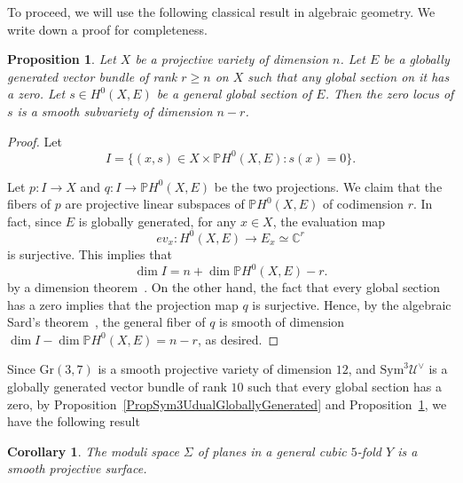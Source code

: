 \documentclass{article}
\newtheorem{proposition}[theorem]{Proposition}
\newtheorem{corollary}[theorem]{Corollary}
\theoremstyle{definition}
\begin{document}
To proceed, we will use the following classical result in algebraic geometry. We write down a proof for completeness.
\begin{proposition}\label{PropGloballyGeneratedVBHasGoodProp}
    Let $X$ be a projective variety of dimension $n$. Let $E$ be a globally generated vector bundle of rank $r\geq n$ on $X$ such that any global section on it has a zero. Let $s\in H^0(X,E)$ be a general global section of $E$. Then the zero locus of $s$ is a \emph{smooth} subvariety of dimension $n - r$.
\end{proposition}
\begin{proof}
Let 
\[ I = \{(x, s) \in X \times \mathbb{P}H^0(X, E) : s(x) = 0\}. \]

Let \( p: I \to X \) and \( q: I \to \mathbb{P}H^0(X, E) \) be the two projections. We claim that the fibers of \( p \) are projective linear subspaces of \(\mathbb{P}H^0(X, E)\) of codimension \(r\). In fact, since \( E \) is globally generated, for any \( x \in X \), the evaluation map
\[ ev_x: H^0(X, E) \to E_x \simeq \mathbb{C}^r \]
is surjective. This implies that 
\[
\dim I = n + \dim \mathbb PH^0(X, E) - r.
\]
by a dimension theorem~\cite[Ex.II.3.22(c)]{Hartshorne}.
On the other hand, the fact that every global section has a zero implies that the projection map $q$ is surjective. Hence, by the algebraic Sard’s theorem~\cite[Corollary III.10.7]{Hartshorne}, the general fiber of $q$ is smooth of dimension $\dim I - \dim \mathbb PH^0(X, E) = n - r$, as desired.
\end{proof}
Since $\mathrm{Gr}(3, 7)$ is a smooth projective variety of dimension $12$, and $\mathrm{Sym}^3 \mathcal{U}^\vee$ is a globally generated vector bundle of rank $10$ such that every global section has a zero, by Proposition~\ref{PropSym3UdualGloballyGenerated} and Proposition~\ref{PropGloballyGeneratedVBHasGoodProp}, we have the following result
\begin{corollary}
 The moduli space $\Sigma$ of planes in a general cubic $5$-fold $Y$ is a smooth projective surface.
\end{corollary}


\end{document}
